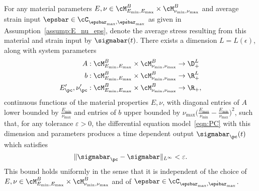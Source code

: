 \documentclass[letterpaper,11pt]{article}
\begin{document}
\begin{theorem}\label{thm:pc_approx}
    For any material parameters $E, \nu \in \cM_{E_{\min}, E_{\max}}^B \times \cM_{\nu_{\min}, \nu_{\max}}^B$ and average strain input $\epsbar \in \cC_{\epsbar_{\max}, \dot{\epsbar}_{\max}}$ as given in Assumption~\ref{assump:E_nu_eps}, denote the average stress resulting from this material and strain input by $\sigmabar(t)$. There exists a dimension $L = L(\epsilon)$, along with system parameters
    \begin{equation}
    \begin{aligned}
        A&: \cM_{E_{\min}, E_{\max}}^B \times \cM_{\nu_{\min}, \nu_{\max}}^B \to \D_+^L\\
        b&: \cM_{E_{\min}, E_{\max}}^B \times \cM_{\nu_{\min}, \nu_{\max}}^B \to \R_+^L\\
        E'_{\pc}, \nu'_{\pc}&: \cM_{E_{\min}, E_{\max}}^B \times \cM_{\nu_{\min}, \nu_{\max}}^B \to \R_+,
    \end{aligned}
    \end{equation}
    continuous functions of the material properties $E, \nu$, with diagonal entries of $A$ lower bounded by $\frac{E_{\min}}{\nu_{\max}}$ and entries of $b$ upper bounded by $\nu_{\max}\big(\frac{E_{\max}}{\nu_{\min}} - \frac{E_{\min}}{\nu_{\max}}\big)^2$, such that, for any tolerance $\varepsilon > 0$,
    the differential equation model~\eqref{eqn:PC} with this dimension and parameters produces a time dependent output $\sigmabar_{\pc}(t)$ which satisfies
    \begin{equation}
        \|\sigmabar_{\pc} - \sigmabar\|_{L^\infty} < \varepsilon.
    \end{equation}
    This bound holds uniformly in the sense that it is independent of the choice of $E, \nu \in \cM_{E_{\min}, E_{\max}}^B \times \cM_{\nu_{\min}, \nu_{\max}}^B$ and of $\epsbar \in \cC_{\epsbar_{\max}, \dot{\epsbar}_{\max}}$.
\end{theorem}
\end{document}
